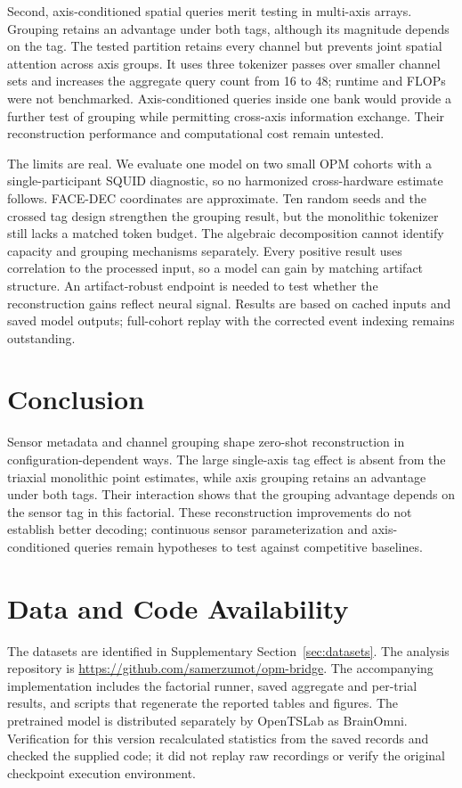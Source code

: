 Second, axis-conditioned spatial queries merit testing in multi-axis arrays. Grouping retains an advantage under both tags, although its magnitude depends on the tag. The tested partition retains every channel but prevents joint spatial attention across axis groups. It uses three tokenizer passes over smaller channel sets and increases the aggregate query count from 16 to 48; runtime and FLOPs were not benchmarked. Axis-conditioned queries inside one bank would provide a further test of grouping while permitting cross-axis information exchange. Their reconstruction performance and computational cost remain untested.

The limits are real. We evaluate one model on two small OPM cohorts with a single-participant SQUID diagnostic, so no harmonized cross-hardware estimate follows. FACE-DEC coordinates are approximate. Ten random seeds and the crossed tag design strengthen the grouping result, but the monolithic tokenizer still lacks a matched token budget. The algebraic decomposition cannot identify capacity and grouping mechanisms separately. Every positive result uses correlation to the processed input, so a model can gain by matching artifact structure. An artifact-robust endpoint is needed to test whether the reconstruction gains reflect neural signal. Results are based on cached inputs and saved model outputs; full-cohort replay with the corrected event indexing remains outstanding.

\section{Conclusion}
Sensor metadata and channel grouping shape zero-shot reconstruction in configuration-dependent ways. The large single-axis tag effect is absent from the triaxial monolithic point estimates, while axis grouping retains an advantage under both tags. Their interaction shows that the grouping advantage depends on the sensor tag in this factorial. These reconstruction improvements do not establish better decoding; continuous sensor parameterization and axis-conditioned queries remain hypotheses to test against competitive baselines.

\section*{Data and Code Availability}
The datasets are identified in Supplementary Section~\ref{sec:datasets}. The analysis repository is \url{https://github.com/samerzumot/opm-bridge}. The accompanying implementation includes the factorial runner, saved aggregate and per-trial results, and scripts that regenerate the reported tables and figures. The pretrained model is distributed separately by OpenTSLab as BrainOmni. Verification for this version recalculated statistics from the saved records and checked the supplied code; it did not replay raw recordings or verify the original checkpoint execution environment.

